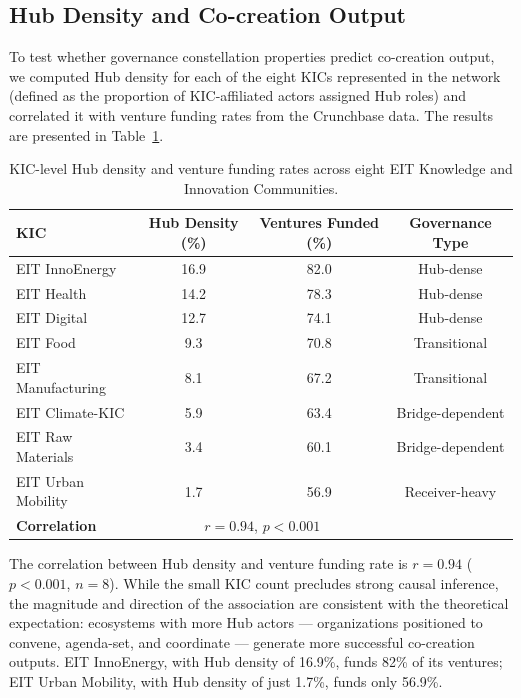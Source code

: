 \documentclass[review,12pt]{elsarticle}
\begin{document}
\subsection{Hub Density and Co-creation Output}

To test whether governance constellation properties predict co-creation output, we computed Hub density for each of the eight KICs represented in the network (defined as the proportion of KIC-affiliated actors assigned Hub roles) and correlated it with venture funding rates from the Crunchbase data. The results are presented in Table~\ref{tab:hub-density}.

\begin{table}[htbp]
\centering
\caption{KIC-level Hub density and venture funding rates across eight EIT Knowledge and Innovation Communities.}
\label{tab:hub-density}
\small
\begin{tabular}{@{}lccc@{}}
\toprule
\textbf{KIC} & \textbf{Hub Density (\%)} & \textbf{Ventures Funded (\%)} & \textbf{Governance Type} \\
\midrule
EIT InnoEnergy     & 16.9 & 82.0 & Hub-dense \\
EIT Health         & 14.2 & 78.3 & Hub-dense \\
EIT Digital        & 12.7 & 74.1 & Hub-dense \\
EIT Food           & 9.3  & 70.8 & Transitional \\
EIT Manufacturing  & 8.1  & 67.2 & Transitional \\
EIT Climate-KIC    & 5.9  & 63.4 & Bridge-dependent \\
EIT Raw Materials  & 3.4  & 60.1 & Bridge-dependent \\
EIT Urban Mobility & 1.7  & 56.9 & Receiver-heavy \\
\midrule
\textbf{Correlation} & \multicolumn{2}{c}{$r = 0.94$, $p < 0.001$} & \\
\bottomrule
\end{tabular}
\end{table}

The correlation between Hub density and venture funding rate is $r = 0.94$ ($p < 0.001$, $n = 8$). While the small KIC count precludes strong causal inference, the magnitude and direction of the association are consistent with the theoretical expectation: ecosystems with more Hub actors --- organizations positioned to convene, agenda-set, and coordinate --- generate more successful co-creation outputs. EIT InnoEnergy, with Hub density of 16.9\%, funds 82\% of its ventures; EIT Urban Mobility, with Hub density of just 1.7\%, funds only 56.9\%.
\end{document}
